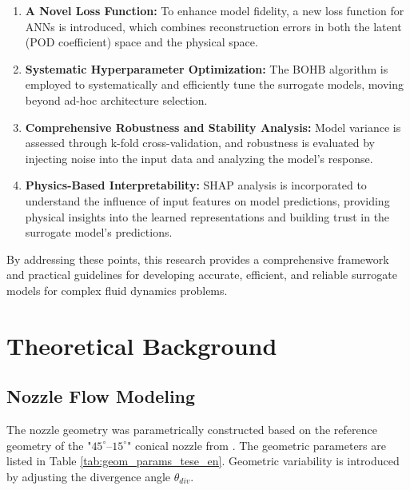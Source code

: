 \documentclass[dscexam, EN]{ufabcFHZh}
\begin{document}
\begin{enumerate}
    \item \textbf{A Novel Loss Function:} To enhance model fidelity, a new loss function for ANNs is introduced, which combines reconstruction errors in both the latent (POD coefficient) space and the physical space.

    \item \textbf{Systematic Hyperparameter Optimization:} The BOHB algorithm \citep{falknerBOHB2018} is employed to systematically and efficiently tune the surrogate models, moving beyond ad-hoc architecture selection.

    \item \textbf{Comprehensive Robustness and Stability Analysis:} Model variance is assessed through k-fold cross-validation, and robustness is evaluated by injecting noise into the input data and analyzing the model's response.

    \item \textbf{Physics-Based Interpretability:} SHAP analysis \citep{lundberg2017unified} is incorporated to understand the influence of input features on model predictions, providing physical insights into the learned representations and building trust in the surrogate model's predictions.
\end{enumerate}

By addressing these points, this research provides a comprehensive framework and practical guidelines for developing accurate, efficient, and reliable surrogate models for complex fluid dynamics problems.
\chapter{Theoretical Background}

\section{Nozzle Flow Modeling}
The nozzle geometry was parametrically constructed based on the reference geometry of the "$45^\circ$–$15^\circ$" conical nozzle from \citet{Back1965a}. The geometric parameters are listed in Table \ref{tab:geom_params_tese_en}. Geometric variability is introduced by adjusting the divergence angle $\theta_{div}$.
\end{document}
